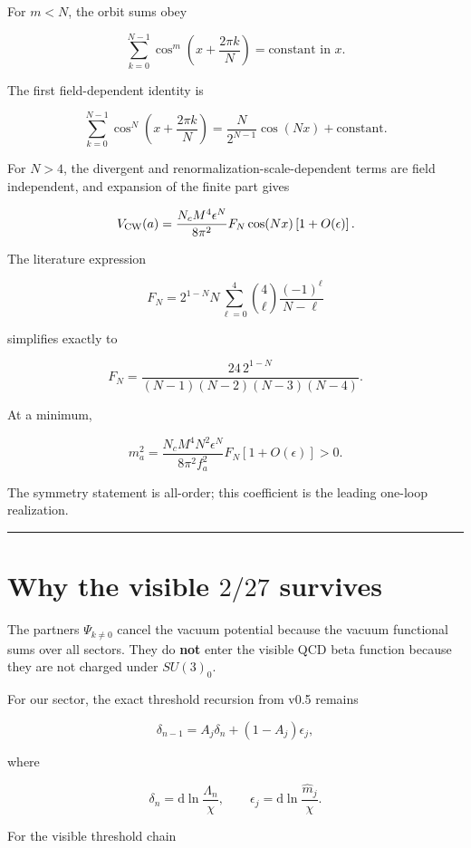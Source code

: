 \documentclass[11pt,a4paper]{article}
\begin{document}
For \(m<N\), the orbit sums obey

\[
\sum_{k=0}^{N-1}
\cos^m\left(x+\frac{2\pi k}{N}\right)
=
\text{constant in }x.
\]

The first field-dependent identity is

\[
\sum_{k=0}^{N-1}
\cos^N\left(x+\frac{2\pi k}{N}\right)
=
\frac{N}{2^{N-1}}\cos(Nx)+\text{constant}.
\]

For \(N>4\), the divergent and renormalization-scale-dependent terms are
field independent, and expansion of the finite part gives

\[
V_{\rm CW}(a)
=
\frac{N_cM^4\epsilon^N}{8\pi^2}
F_N\cos(Nx)
\left[1+O(\epsilon)\right].
\]

The literature expression

\[
F_N
=
2^{1-N}N
\sum_{\ell=0}^{4}
\binom4\ell\frac{(-1)^\ell}{N-\ell}
\]

simplifies exactly to

\[
\boxed{
F_N
=
\frac{24\,2^{1-N}}
{(N-1)(N-2)(N-3)(N-4)}.
}
\]

At a minimum,

\[
\boxed{
 m_a^2
 =
 \frac{N_cM^4N^2\epsilon^N}{8\pi^2f_a^2}F_N
 \left[1+O(\epsilon)\right]>0.
}
\]

The symmetry statement is all-order; this coefficient is the leading
one-loop realization.

\begin{center}\rule{0.5\linewidth}{0.5pt}\end{center}

\section{\texorpdfstring{Why the visible \(2/27\)
survives}{Why the visible 2/27 survives}}\label{why-the-visible-227-survives}

The partners \(\Psi_{k\ne0}\) cancel the vacuum potential because the
vacuum functional sums over all sectors. They do \textbf{not} enter the
visible QCD beta function because they are not charged under
\(SU(3)_0\).

For our sector, the exact threshold recursion from v0.5 remains

\[
\delta_{n-1}
=A_j\delta_n+(1-A_j)\epsilon_j,
\]

where

\[
\delta_n=\mathrm d\ln\frac{\Lambda_n}{\chi},
\qquad
\epsilon_j=\mathrm d\ln\frac{\widehat m_j}{\chi}.
\]

For the visible threshold chain
\end{document}
